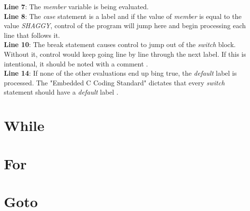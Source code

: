 \documentclass[../main.tex]{subfiles}
\begin{document}
	

	\textbf{Line 7}: The \textit{member} variable is being evaluated. \\
	\textbf{Line 8}: The \textit{case} statement is a label and if the value of \textit{member} is equal to the value \textit{SHAGGY}, control of the program will jump here and begin processing each line that follows it. \\
	\textbf{Line 10}: The break statement causes control to jump out of the \textit{switch} block.  Without it, control would keep going line by line through the next label.  If this is intentional, it should be noted with a comment \cite{embedded_c}.\\
	\textbf{Line 14}: If none of the other evaluations end up bing true, the \textit{default} label is processed.  The "Embedded C Coding Standard" dictates that every \textit{switch} statement should have a \textit{default} label \cite{embedded_c}.\\
	
	\section{While}
	
	\section{For}
	
	\section{Goto}
	
\end{document}
